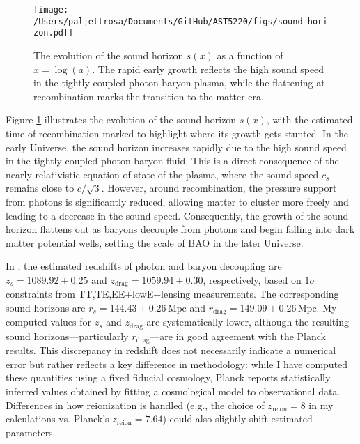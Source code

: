 \documentclass{aa}
\numberwithin{equation}{section}
\numberwithin{table}{section}
\numberwithin{figure}{section}
\begin{document}


\begin{figure}
  \centering
  \texttt{[image: /Users/paljettrosa/Documents/GitHub/AST5220/figs/sound\_horizon.pdf]}
  \caption{The evolution of the sound horizon $s(x)$ as a function of $x = \log(a)$. The rapid early growth reflects the high sound speed in the tightly coupled photon-baryon plasma, while the flattening at recombination marks the transition to the matter era.}\label{fig:sound horizon}
\end{figure}

Figure \ref{fig:sound horizon} illustrates the evolution of the sound horizon $s(x)$, with the estimated time of recombination marked to highlight where its growth gets stunted. In the early Universe, the sound horizon increases rapidly due to the high sound speed in the tightly coupled photon-baryon fluid. This is a direct consequence of the nearly relativistic equation of state of the plasma, where the sound speed $c_s$ remains close to $c/\sqrt{3}$. However, around recombination, the pressure support from photons is significantly reduced, allowing matter to cluster more freely and leading to a decrease in the sound speed. Consequently, the growth of the sound horizon flattens out as baryons decouple from photons and begin falling into dark matter potential wells, setting the scale of BAO in the later Universe.

In \cite{Planck}, the estimated redshifts of photon and baryon decoupling are $z_s = 1089.92\pm0.25$ and $z_\text{drag} = 1059.94\pm0.30$, respectively, based on $1\sigma$ constraints from TT,TE,EE+lowE+lensing measurements. The corresponding sound horizons are $r_s = 144.43\pm0.26\,\text{Mpc}$ and $r_\text{drag} = 149.09\pm0.26\,\text{Mpc}$. My computed values for $z_s$ and $z_\text{drag}$ are systematically lower, although the resulting sound horizons—particularly $r_\text{drag}$—are in good agreement with the Planck results. This discrepancy in redshift does not necessarily indicate a numerical error but rather reflects a key difference in methodology: while I have computed these quantities using a fixed fiducial cosmology, Planck reports statistically inferred values obtained by fitting a cosmological model to observational data. Differences in how reionization is handled (e.g., the choice of $z_\text{reion} = 8$ in my calculations vs. Planck's $z_\text{reion} = 7.64$) could also slightly shift estimated parameters.
\end{document}
